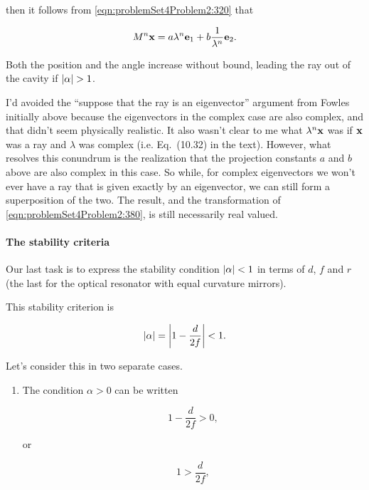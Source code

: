 {then it follows from \ref{eqn:problemSet4Problem2:320} that

\begin{dmath}\label{eqn:problemSet4Problem2:380}
M^n \Bx = a \lambda^n \Be_1 + b \inv{\lambda^n} \Be_2.
\end{dmath}

Both the position and the angle increase without bound, leading the ray out of the cavity if ${\left\lvert{\alpha}\right\rvert} > 1$.  

I'd avoided the ``suppose that the ray is an eigenvector'' argument from Fowles initially above because the eigenvectors in the complex case are also complex, and that didn't seem physically realistic.  It also wasn't clear to me what $\lambda^n \mathbf{x}$ was if $\mathbf{x}$ was a ray and $\lambda$ was complex (i.e.  Eq.~(10.32) in the text).  However, what resolves this conundrum is the realization that the projection constants $a$ and $b$ above are also complex in this case.  So while, for complex eigenvectors we won't ever have a ray that is given exactly by an eigenvector, we can still form a superposition of the two.  The result, and the transformation of \ref{eqn:problemSet4Problem2:380}, is still necessarily real valued.

\paragraph{The stability criteria}

Our last task is to express the stability condition ${\left\lvert{\alpha}\right\rvert} < 1$ in terms of $d$, $f$ and $r$ (the last for the optical resonator with equal curvature mirrors).

This stability criterion is 

\begin{equation}\label{eqn:problemSet4Problem2:400}
{\left\lvert{\alpha}\right\rvert} = {\left\lvert{1 - \frac{d}{2f}}\right\rvert} < 1.
\end{equation}

Let's consider this in two separate cases.
\begin{enumerate}
\item The condition $\alpha > 0$ can be written

\begin{dmath}\label{eqn:problemSet4Problem2:420}
1 - \frac{d}{2f} > 0 ,
\end{dmath}

or

\begin{dmath}\label{eqn:problemSet4Problem2:560}
1 > \frac{d}{2f},
\end{dmath}


\end{enumerate}}

